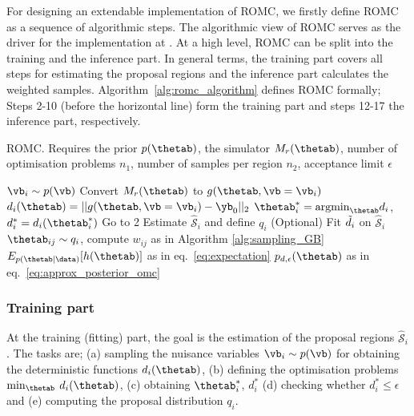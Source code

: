 For designing an extendable implementation of ROMC, we firstly define
ROMC as a sequence of algorithmic steps. The algorithmic view of ROMC
serves as the driver for the implementation at . At a high
level, ROMC can be split into the training and the inference part. In
general terms, the training part covers all steps for estimating the
proposal regions and the inference part calculates the weighted
samples. Algorithm~\ref{alg:romc_algorithm} defines ROMC formally;
Steps 2-10 (before the horizontal line) form the training part and
steps 12-17 the inference part, respectively.

\begin{algorithm}[!ht]
	\caption{ROMC. Requires the prior \( p(\thetab) \), the simulator
    \(M_r(\thetab)\), number of optimisation problems \(n_1\), number
    of samples per region \(n_2\), acceptance limit
    \(\epsilon\)}\label{alg:romc_algorithm}
	\begin{algorithmic}[1]
    \State \(\vb_i \sim p(\vb)\) 
    \State Convert \(M_r(\thetab) \) to \( g(\thetab, \vb=\vb_i) \) 
      \State \( d_i(\thetab) = ||g(\thetab, \vb=\vb_i) - \yb_0||_2 \) 
      \State \(\thetab_i^* = \text{argmin}_{\thetab} d_i\), \(d_i^*=d_i(\thetab_i^*)\) 
        \State Go to 2 
      \EndIf
      \State Estimate \(\mathcal{\hat{S}}_i\) and define \(q_i\) 
      \State (Optional) Fit \(\Tilde{d}_i\) on \(\mathcal{\hat{S}}_i\) 
      \\\hrulefill
      \State \(\thetab_{ij} \sim q_i\), compute \(w_{ij}\) as in Algorithm \ref{alg:sampling_GB} 
      \EndFor
    \EndFor
    \State \(E_{p(\thetab|\data)}[h(\thetab)]\) as in eq.~\eqref{eq:expectation} 
    \State \(p_{d,\epsilon}(\thetab) \) as in eq.~\eqref{eq:approx_posterior_omc} 
    \EndProcedure
	\end{algorithmic}
\end{algorithm}

\subsubsection*{Training part}
\noindent
At the training (fitting) part, the goal is the estimation of the
proposal regions \(\mathcal{\hat{S}}_i\). The tasks are; (a) sampling
the nuisance variables \(\vb_i \sim p(\vb)\) for obtaining the
deterministic functions \(d_i(\thetab)\), (b) defining the optimisation
problems \(\min_{\thetab} \: d_i(\thetab)\), (c) obtaining
\(\thetab_i^*\), \(d_i^*\) (d) checking whether \(d_i^* \leq \epsilon\) and
(e) computing the proposal distribution \(q_i\).

